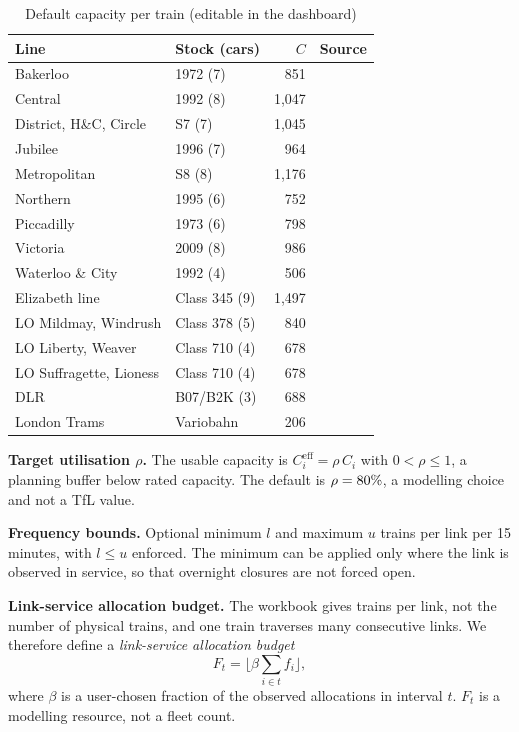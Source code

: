 \documentclass[conference]{IEEEtran}
\newcommand{\Ceff}{C^{\mathrm{eff}}}
\begin{document}
\begin{table}[!t]
\caption{Default capacity per train (editable in the dashboard)}\label{tab:capacity}
\centering\scriptsize
\setlength{\tabcolsep}{4pt}
\begin{tabular}{@{}l l r c@{}}
\toprule
Line & Stock (cars) & $C$ & Source \\
\midrule
Bakerloo & 1972 (7) & 851 & \cite{tfl_rs4} \\
Central & 1992 (8) & 1{,}047 & \cite{tfl_rs4} \\
District, H\&C, Circle & S7 (7) & 1{,}045 & \cite{tfl_rs4} \\
Jubilee & 1996 (7) & 964 & \cite{tfl_rs4} \\
Metropolitan & S8 (8) & 1{,}176 & \cite{tfl_rs4} \\
Northern & 1995 (6) & 752 & \cite{tfl_rs4} \\
Piccadilly & 1973 (6) & 798 & \cite{tfl_rs4} \\
Victoria & 2009 (8) & 986 & \cite{tfl_rs4} \\
Waterloo \& City & 1992 (4) & 506 & \cite{tfl_rs4} \\
Elizabeth line & Class 345 (9) & 1{,}497 & \cite{tfl_345} \\
LO Mildmay, Windrush & Class 378 (5) & 840 & \cite{tfl_378} \\
LO Liberty, Weaver & Class 710 (4) & 678 & \cite{wiki_710} \\
LO Suffragette, Lioness & Class 710 (4) & 678 & \cite{wiki_710} \\
DLR & B07/B2K (3) & 688 & \cite{wiki_dlr} \\
London Trams & Variobahn & 206 & \cite{wiki_tram} \\
\bottomrule
\end{tabular}
\end{table}

\textbf{Target utilisation $\rho$.} The usable capacity is $\Ceff_i = \rho\,C_i$ with $0 < \rho \le 1$, a planning buffer
below rated capacity. The default is $\rho = 80\%$, a modelling choice and not a TfL value.

\textbf{Frequency bounds.} Optional minimum $l$ and maximum $u$ trains per link per 15 minutes, with $l \le u$
enforced. The minimum can be applied only where the link is observed in service, so that overnight closures are not
forced open.

\textbf{Link-service allocation budget.} The workbook gives trains per link, not the number of physical trains, and one
train traverses many consecutive links. We therefore define a \emph{link-service allocation budget}
\begin{equation}
F_t = \Big\lfloor \beta \sum_{i \in t} f_i \Big\rfloor,
\end{equation}
where $\beta$ is a user-chosen fraction of the observed allocations in interval $t$. $F_t$ is a modelling resource, not
a fleet count.
\end{document}
